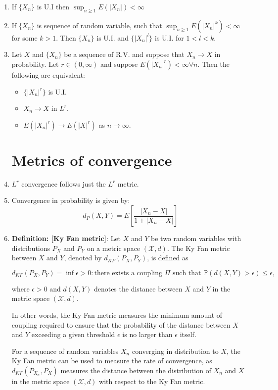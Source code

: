 \documentclass[12pt,oneside]{book}
\begin{document}
\begin{enumerate}
\item If $\{X_n\}$ is U.I then $\sup_{n\geq 1}E\left(|X_n|\right)<\infty$
\item If $\{X_n\}$ is sequence of random variable, such that $\sup_{n\geq 1}E\left(|X_n|^k\right)<\infty$ for some $k>1$. Then $\{X_n\}$ is U.I. and $\{|X_n|^l\}$ is U.I. for $1<l<k$. 
\item Let $X$ and $\{X_n\}$ be a sequence of R.V. and suppose that $X_n\to X$ in probability. Let $r\in(0,\infty)$ and suppose $E\left(|X_n|^r\right)<\infty\forall n$. Then the following are equivalent:
\begin{itemize}
    \item $\{|X_n|^r\}$ is U.I.
    \item $X_n\to X$ in $L^r$.
    \item $E\left(|X_n|^r\right)\to E\left(|X|^r\right)$ as $n\to\infty$.
\end{itemize} 

\section{Metrics of convergence}
\item $L^r$ convergence follows just the $L^r$ metric.
\item Convergence in probability is given by:
    $$d_P(X,Y)=E\left[\frac{|X_n-X|}{1+|X_n-X|}\right]$$
\item \textbf{Definition: [Ky Fan metric]}: Let $X$ and $Y$ be two random variables with distributions $P_X$ and $P_Y$ on a metric space $(\mathcal{X}, d)$. The Ky Fan metric between $X$ and $Y$, denoted by $d_{KF}(P_X, P_Y)$, is defined as

\begin{equation*}
d_{KF}(P_X, P_Y) = \inf {\epsilon > 0: \text{there exists a coupling } \Pi \text{ such that } \mathbb{P}(d(X,Y)>\epsilon) \leq \epsilon},
\end{equation*}

where $\epsilon > 0$ and $d(X,Y)$ denotes the distance between $X$ and $Y$ in the metric space $(\mathcal{X}, d)$.

In other words, the Ky Fan metric measures the minimum amount of coupling required to ensure that the probability of the distance between $X$ and $Y$ exceeding a given threshold $\epsilon$ is no larger than $\epsilon$ itself.

For a sequence of random variables ${X_n}$ converging in distribution to $X$, the Ky Fan metric can be used to measure the rate of convergence, as $d_{KF}(P_{X_n}, P_X)$ measures the distance between the distribution of $X_n$ and $X$ in the metric space $(\mathcal{X}, d)$ with respect to the Ky Fan metric.


\end{enumerate}
\end{document}
